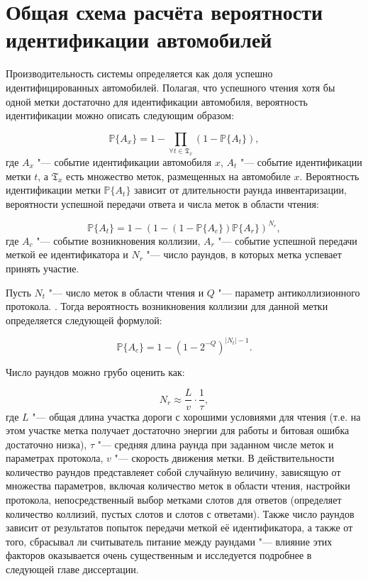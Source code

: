 \section{Общая схема расчёта вероятности идентификации автомобилей}\label{sec:ch2_general_scheme}
Производительность системы определяется как доля успешно идентифицированных автомобилей. Полагая, что успешного чтения хотя бы одной метки достаточно для идентификации автомобиля, вероятность идентификации можно описать следующим образом:

$$
	\mathbb{P}\{A_x\} = 1 - \prod\limits_{\forall t \in  \mathfrak{T}_x} (1 - \mathbb{P}\{A_t\}),
$$
где $A_x$ "--- событие идентификации автомобиля $x$, $A_t$ "--- событие идентификации метки $t$, а $\mathfrak{T}_x$ есть множество меток, размещенных на автомобиле $x$. Вероятность идентификации метки $\mathbb{P}\{A_t\}$ зависит от длительности раунда инвентаризации, вероятности успешной передачи ответа и числа меток в области чтения:

$$
	\mathbb{P}\{A_t\} = 1 - (1 - (1 - \mathbb{P}\{A_c\})\mathbb{P}\{A_r\})^{N_r},
$$
где $A_c$ "--- событие возникновения коллизии, $A_r$ "--- событие успешной передачи меткой ее идентификатора и $N_r$ "--- число раундов, в которых метка успевает принять участие.

Пусть $N_t$ "--- число меток в области чтения и $Q$ "--- параметр антиколлизионного протокола. \cite{StdGen2}. Тогда вероятность возникновения коллизии для данной метки определяется следующей формулой:

$$
	\mathbb{P}\{A_c\} = 1 - (1 - 2^{-Q})^{|N_t| - 1}.
$$

Число раундов можно грубо оценить как:

$$
	N_r \approx \frac{L}{v}\cdot\frac{1}{\tau},
$$
где $L$ "--- общая длина участка дороги с хорошими условиями для чтения (т.е. на этом участке метка получает достаточно энергии для работы и битовая ошибка достаточно низка), $\tau$ "--- средняя длина раунда при заданном числе меток и параметрах протокола, $v$ "--- скорость движения метки. В действительности количество раундов представлеяет собой случайную величину, зависящую от множества параметров, включая количество меток в области чтения, настройки протокола, непосредственный выбор метками слотов для ответов (определяет количество коллизий, пустых слотов и слотов с ответами). Также число раундов зависит от результатов попыток передачи меткой её идентификатора, а также от того, сбрасывал ли считыватель питание между раундами "--- влияние этих факторов оказывается очень существенным и исследуется подробнее в следующей главе диссертации.

